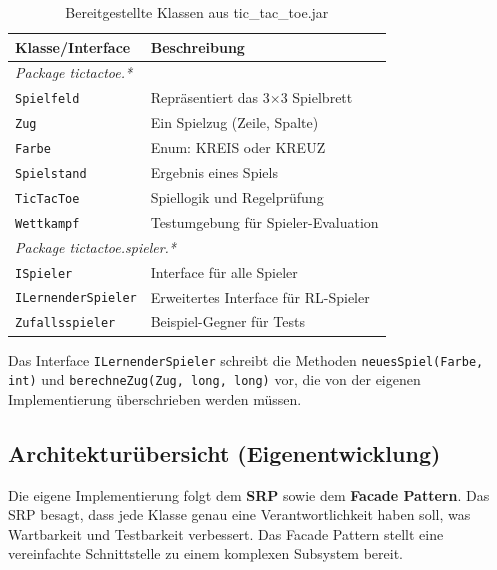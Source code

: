 \begin{table}[H]
\centering
\begin{tabular}{l|l}
\textbf{Klasse/Interface} & \textbf{Beschreibung} \\
\hline
\multicolumn{2}{l}{\textit{Package tictactoe.*}} \\
\texttt{Spielfeld} & Repräsentiert das 3$\times$3 Spielbrett \\
\texttt{Zug} & Ein Spielzug (Zeile, Spalte) \\
\texttt{Farbe} & Enum: KREIS oder KREUZ \\
\texttt{Spielstand} & Ergebnis eines Spiels \\
\texttt{TicTacToe} & Spiellogik und Regelprüfung \\
\texttt{Wettkampf} & Testumgebung für Spieler-Evaluation \\
\hline
\multicolumn{2}{l}{\textit{Package tictactoe.spieler.*}} \\
\texttt{ISpieler} & Interface für alle Spieler \\
\texttt{ILernenderSpieler} & Erweitertes Interface für RL-Spieler \\
\texttt{Zufallsspieler} & Beispiel-Gegner für Tests \\
\end{tabular}
\caption{Bereitgestellte Klassen aus tic\_tac\_toe.jar}
\end{table}

Das Interface \texttt{ILernenderSpieler} schreibt die Methoden \texttt{neuesSpiel(Farbe, int)} und \texttt{berechneZug(Zug, long, long)} vor, die von der eigenen Implementierung überschrieben werden müssen.

\subsection{Architekturübersicht (Eigenentwicklung)}

Die eigene Implementierung folgt dem \textbf{\ac{SRP}} sowie dem \textbf{Facade Pattern}. Das \ac{SRP} besagt, dass jede Klasse genau eine Verantwortlichkeit haben soll, was Wartbarkeit und Testbarkeit verbessert. Das Facade Pattern stellt eine vereinfachte Schnittstelle zu einem komplexen Subsystem bereit.

